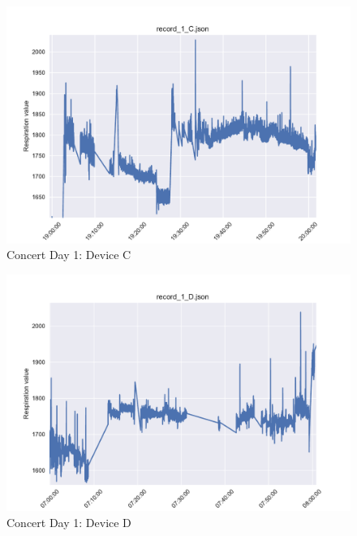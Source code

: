 \begin{figure}
    \centering
    \includegraphics[scale=0.6]{images/record_1_c.pdf}
    \caption{Concert Day 1: Device C}
    \label{fig:concert_day1_c}
\end{figure}

\begin{figure}
    \centering
    \includegraphics[scale=0.6]{images/record_1_d.pdf}
    \caption{Concert Day 1: Device D}
    \label{fig:concert_day1_d}
\end{figure}

